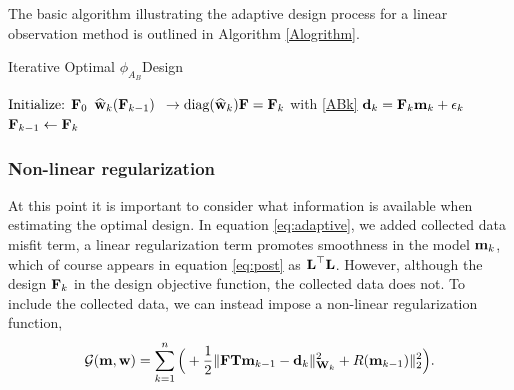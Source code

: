 \documentclass[12pt]{article}
\newcommand {\bfd}   { {\bf d} }
\newcommand {\bfw}   { {\bf w} }
\newcommand {\bfm}   { {\bf m} }
\newcommand {\bfF}  { {\bf F} }
\newcommand{\hf}		 {\frac12}
\newcommand{\bF}  { {\bf F} }      %
\newcommand{\bT}  {\text{\bf T}} %
\newcommand{\bfW}  {\text{{\bf W}}} %
\newcommand{\bfL}  {\text{{\bf L}}} %
\newcommand{\what}{\widehat{\bf w}}
\begin{document}
The basic algorithm illustrating the adaptive design process for a linear observation method is outlined in Algorithm \ref{Alogrithm}. 
\begin{algorithm}
\caption{Iterative Optimal $\phi_{A_{B}}$Design}\label{Alogrithm}
\begin{algorithmic}[1]
%
\State $\text{Initialize: }\bF_{0}$
%
%
\State $\what_k(\bF_{k-1})$  $\ \to \text{diag}(\what_k)\bfF = \bfF_k $  with \ref{ABk}
%
\State $\bfd_k = \bfF_k \bfm_k + \epsilon_k$
%
\State $\bF_{k-1} \leftarrow \bF_k$
\EndFor\label{euclidendwhile}
\end{algorithmic}
\end{algorithm}

\bigskip
\subsubsection{Non-linear regularization}
At this point it is important to consider what information is available when estimating the optimal design. In equation \eqref{eq:adaptive}, we added  collected data misfit term,  a linear regularization term promotes smoothness in the model $\bfm_k$, which of course appears in equation \eqref{eq:post} as $\bfL^{\top}\bfL$. However, although the design $\bF_k$ in the design objective function, the collected data does not.  To include the collected data, we can instead impose a non-linear regularization function,
\begin{equation}
\label{eq:adaptiveNon}
\mathcal{G}(\bfm,\bfw) = \sum_{k=1}^{n} \Big ( + \hf  \| \bF \bT\bfm_{k-1} - \bfd_{k} \|^2_{\bfW_{k}} + R(\bfm_{k-1}) \|^2_2\Big).
\end{equation}
\end{document}
